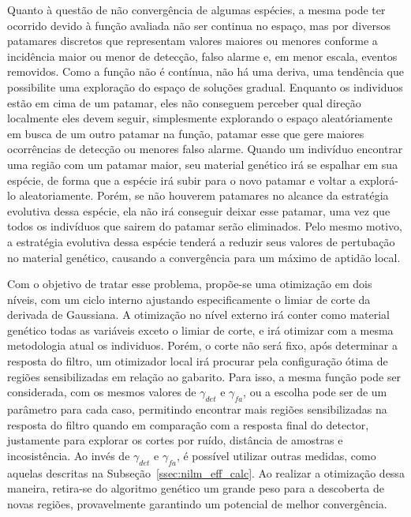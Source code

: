 Quanto à questão de não convergência de algumas espécies, a mesma pode
ter ocorrido devido à função avaliada não ser continua no espaço, mas
por diversos patamares discretos que representam valores maiores ou
menores conforme a incidência maior ou menor de detecção, falso alarme
e, em menor escala, eventos removidos. Como a função não é contínua,
não há uma deriva, uma tendência que possibilite uma exploração do
espaço de soluções gradual. Enquanto os individuos estão em cima de um
patamar, eles não conseguem perceber qual direção localmente eles
devem seguir, simplesmente explorando o espaço aleatóriamente em busca
de um outro patamar na função, patamar esse que gere maiores
ocorrências de detecção ou menores falso alarme. Quando um indivíduo
encontrar uma região com um patamar maior, seu material genético irá
se espalhar em sua espécie, de forma que a espécie irá subir para o
novo patamar e voltar a explorá-lo aleatoriamente. Porém, se não
houverem patamares no alcance da estratégia evolutiva dessa espécie,
ela não irá conseguir deixar esse patamar, uma vez que todos os
indivíduos que sairem do patamar serão eliminados. Pelo mesmo motivo,
a estratégia evolutiva dessa espécie tenderá a reduzir seus valores
de pertubação no material genético, causando a convergência para um
máximo de aptidão local. 

Com o objetivo de tratar esse problema, propõe-se uma
otimização em dois níveis, com um ciclo interno ajustando
especificamente o limiar de corte da derivada de Gaussiana. A
otimização no nível externo irá conter como material genético todas as
variáveis exceto o limiar de corte, e irá otimizar com a mesma
metodologia atual os individuos. Porém, o corte não será fixo, após
determinar a resposta do filtro, um otimizador local irá procurar pela
configuração ótima de regiões sensibilizadas em relação ao gabarito.
Para isso, a mesma função pode ser considerada, com os mesmos valores
de $\gamma_{det}$ e $\gamma_{fa}$, ou a escolha pode ser de um
parâmetro para cada caso, permitindo encontrar mais regiões
sensibilizadas na resposta do filtro quando em comparação com a
resposta final do detector, justamente para explorar os cortes por
ruído, distância de amostras e incosistência. Ao invés de
$\gamma_{det}$ e $\gamma_{fa}$, é possível utilizar outras medidas,
como aquelas descritas na Subseção~\ref{ssec:nilm_eff_calc}. Ao
realizar a otimização dessa maneira, retira-se do algoritmo genético
um grande peso para a descoberta de novas regiões, provavelmente
garantindo um potencial de melhor convergência.

